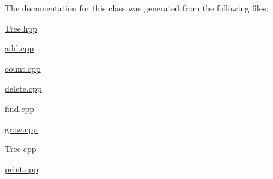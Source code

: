 The documentation for this class was generated from the following files\+:\begin{DoxyCompactItemize}
\item 
\hyperlink{_tree_8hpp}{Tree.\+hpp}\item 
\hyperlink{add_8cpp}{add.\+cpp}\item 
\hyperlink{count_8cpp}{count.\+cpp}\item 
\hyperlink{delete_8cpp}{delete.\+cpp}\item 
\hyperlink{find_8cpp}{find.\+cpp}\item 
\hyperlink{grow_8cpp}{grow.\+cpp}\item 
\hyperlink{_tree_8cpp}{Tree.\+cpp}\item 
\hyperlink{print_8cpp}{print.\+cpp}\end{DoxyCompactItemize}
